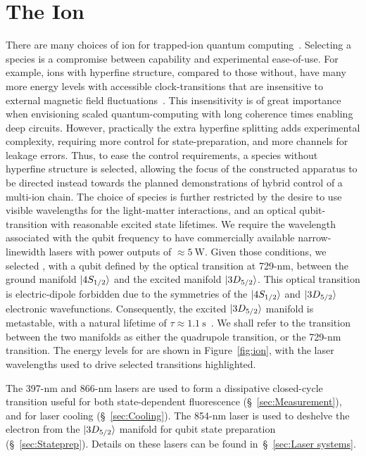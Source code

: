 \section{The Ion}
\label{sec:Transitions}


    There are many choices of ion for trapped-ion quantum computing~\cite{bruzewicz_trapped-ion_2019}.
    Selecting a species is a compromise between capability and experimental
    ease-of-use. For example, ions with hyperfine structure, compared to those
    without, have many more energy levels with accessible clock-transitions that
    are insensitive to external magnetic field fluctuations~\cite{langer_long-lived_2005,harty_high-fidelity_2014}. This
    insensitivity is of great importance when envisioning scaled
    quantum-computing with long coherence times enabling deep circuits. However,
    practically the extra hyperfine splitting adds experimental complexity,
    requiring more control for state-preparation, and more channels for leakage
    errors. 
    Thus, to ease the control requirements, a species without hyperfine structure is selected, allowing the focus of the constructed apparatus to be directed instead towards the planned demonstrations of hybrid control of a multi-ion chain.
    The choice of species is further restricted by the desire to use
    visible wavelengths for the light-matter interactions, and an optical
    qubit-transition with reasonable excited state lifetimes. We require the
    wavelength associated with the qubit frequency to have commercially
    available narrow-linewidth lasers with power outputs of $\approx
    5~\unit{\watt}$. Given those conditions, we selected \ca, with a qubit defined by the
    optical transition at 729-nm, between the ground manifold $\ket{4S_{1/2}}$
    and the excited manifold $\ket{3D_{5/2}}$. 
    This optical transition is electric-dipole
    forbidden due to the symmetries of the $\ket{4S_{1/2}}$ and $\ket{3D_{5/2}}$
    electronic wavefunctions. Consequently, the excited $\ket{3D_{5/2}}$ manifold is 
    metastable, with a natural
    lifetime of $\tau \approx 1.1~\unit{\second}$~\cite{barton_measurement_2000}. 
    We shall refer to the transition between the two manifolds as either the
    quadrupole transition, or the 729-nm transition.
    The energy levels for
    \ca are shown in Figure~\ref{fig:ion}, 
    with the laser wavelengths used to drive selected transitions highlighted.

    The 397-nm and 866-nm lasers are used to form a dissipative closed-cycle
    transition useful for both state-dependent fluorescence
    (\S~\ref{sec:Measurement}), and for laser cooling (\S~\ref{sec:Cooling}).
    The 854-nm laser is used to deshelve the electron from the $\ket{3D_{5/2}}$
    manifold for qubit state preparation (\S~\ref{sec:Stateprep}). Details on
    these lasers can be found in~\S~\ref{sec:Laser systems}.

